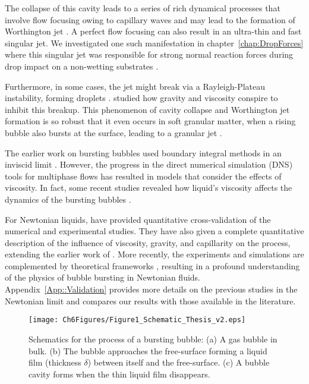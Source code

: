 The collapse of this cavity leads to a series of rich dynamical processes that involve flow focusing owing to capillary waves \citep{zeff2000singularity, duchemin2002jet} and may lead to the formation of Worthington jet \citep{gordillo2019capillary}. A perfect flow focusing can also result in an ultra-thin and fast singular jet. We investigated one such manifestation in chapter~\ref{chap:DropForces} where this singular jet was responsible for strong normal reaction forces during drop impact on a non-wetting substrates \citep[also see][]{bartolo2006singular, zhang2022impact}.

 Furthermore, in some cases, the jet might break via a Rayleigh-Plateau instability, forming droplets \citep{ghabache2014physics,ghabache2016size}. \citet{walls2015jet} studied how gravity and viscosity conspire to inhibit this breakup. This phenomenon of cavity collapse and Worthington jet formation is so robust that it even occurs in soft granular matter, when a rising bubble also bursts at the surface, leading to a granular jet \citep{lohse2004impact}.

The earlier work on bursting bubbles used boundary integral methods in an inviscid limit \citep{boulton1993gas,longuet1995critical}. However, the progress in the direct numerical simulation (DNS) tools for multiphase flows \citep{prosperetti2009computational, tryggvason2011direct, popinet2003gerris, popinet2009accurate} has resulted in models that consider the effects of viscosity. In fact, some recent studies revealed how liquid's viscosity affects the dynamics of the bursting bubbles \citep{deike2018dynamics, gordillo2019capillary}.

For Newtonian liquids, \citet{deike2018dynamics} have provided quantitative cross-validation of the numerical and experimental studies. They have also given a complete quantitative description of the influence of viscosity, gravity, and capillarity on the process, extending the earlier work of \citet{duchemin2002jet}. More recently, the experiments and simulations are complemented by theoretical frameworks  \citep{gordillo2019capillary, ganan2017revision}, resulting in a profound understanding of the physics of bubble bursting in Newtonian fluids. Appendix~\ref{App::Validation} provides more details on the previous studies in the Newtonian limit and compares our results with those available in the literature.

\begin{figure}
	\centering
	\texttt{[image: Ch6Figures/Figure1\_Schematic\_Thesis\_v2.eps]}	
	\caption{Schematics for the process of a bursting bubble: (a) A gas bubble in bulk. (b) The bubble approaches the free-surface forming a liquid film (thickness $\delta$) between itself and the free-surface. (c) A bubble cavity forms when the thin liquid film disappears.}
	\label{Ch7::fig:Schematic}
\end{figure}

